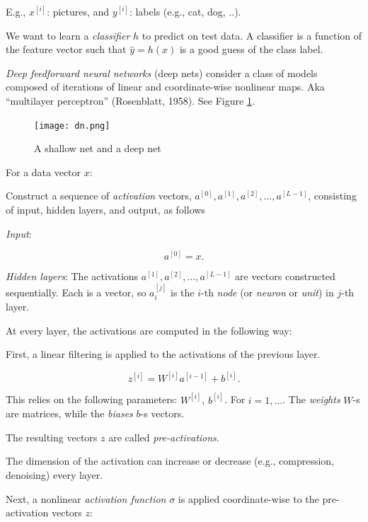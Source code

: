 \documentclass[english]{article}
\begin{document}
E.g., $x^{[i]}$: pictures, and $y^{[i]}$: labels (e.g., cat, dog, ..).

 We want to learn a \emph{classifier} $h$ to predict on test data. A classifier is a function of the feature vector such that $\hat y = h(x)$ is a good guess of the class label.



\item \emph{Deep feedforward neural networks} (deep nets) consider a class of models composed of iterations of linear and coordinate-wise nonlinear maps. Aka ``multilayer perceptron'' (Rosenblatt, 1958). See Figure \ref{dn}. 

\begin{figure}
  \centering
  \texttt{[image: dn.png]}
  \caption{A shallow net and a deep net}
  \label{dn}
\end{figure}



For a data vector $x$: 

Construct a sequence of \emph{activation} vectors, $a^{[0]}, a^{[1]}, a^{[2]}, \ldots, a^{[L-1]}$, consisting of input, hidden layers, and output, as follows

\benum 
\item  \emph{Input}: 

$$ a^{[0]}  = x.$$

\item  \emph{Hidden layers}: The activations $a^{[1]}, a^{[2]}, \ldots, a^{[L-1]}$ are vectors constructed sequentially. Each is a vector, so $a_i^{[j]}$ is the $i$-th \emph{node} (or \emph{neuron} or \emph{unit}) in $j$-th layer. 

At every layer, the activations are computed in the following way: 

\benum 

\item First, a linear filtering is applied to the activations of the previous layer. 

$$z^{[i]} = W^{[i]}a^{[i-1]}+b^{[i]}.$$

This relies on the following parameters: $W^{[i]}$, $b^{[i]}$. For $i=1,\ldots$. The \emph{weights} $W$-s are matrices, while the \emph{biases} $b$-s vectors.

The resulting vectors $z$ are called \emph{pre-activations}.

The dimension of the activation can increase or decrease (e.g., compression, denoising) every layer. 

\item 
Next, a nonlinear \emph{activation function} $\sigma$ is applied coordinate-wise to the pre-activation vectors $z$: 
\end{document}
